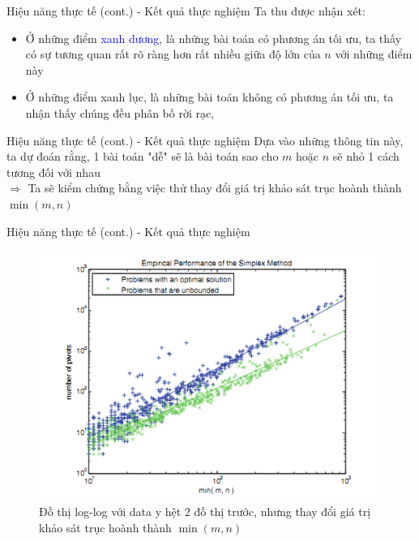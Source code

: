 \documentclass[10pt]{beamer}
\begin{document}
\begin{frame}[fragile]{Hiệu năng thực tế (cont.) - Kết quả thực nghiệm}
Ta thu được nhận xét:
\begin{itemize}
\item Ở những điểm \textcolor{blue}{xanh dương}, là những bài toán có phương án tối ưu, ta thấy có sự tương quan rất rõ ràng hơn rất nhiều giữa độ lớn của $n$ với những điểm này
\item Ở những điểm \textcolor{codegreen}{xanh lục}, là những bài toán không có phương án tối ưu, ta nhận thấy chúng đều phân bố rời rạc,
\end{itemize}
\end{frame}

\begin{frame}[fragile]{Hiệu năng thực tế (cont.) - Kết quả thực nghiệm}
Dựa vào những thông tin này, ta dự đoán rằng, 1 bài toán "dễ" sẽ là bài toán sao cho $m$ hoặc $n$ sẽ nhỏ 1 cách tương đối với nhau \\
$\Rightarrow$ Ta sẽ kiểm chứng bằng việc thử thay đổi giá trị khảo sát trục hoành thành $\min(m, n)$ \\
\end{frame}

\begin{frame}[fragile]{Hiệu năng thực tế (cont.) - Kết quả thực nghiệm}
\begin{figure}
\includegraphics[scale=.5]{img/plot_3.png}
\caption{Đồ thị log-log với data y hệt 2 đồ thị trước, nhưng thay đổi giá trị khảo sát trục hoành thành $\min(m, n)$}
\end{figure}
\end{frame}
\end{document}
